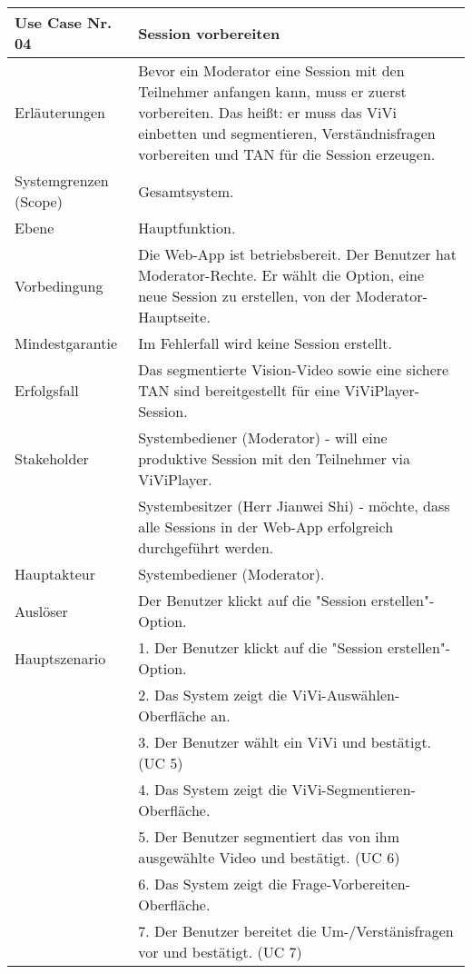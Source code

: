 \begin{tabularx}{\linewidth}{|l|X|}
	\hline
	Use Case Nr. 04			& \textbf{Session vorbereiten} \\ \hline
	Erläuterungen			& Bevor ein Moderator eine Session mit den Teilnehmer anfangen 
	                          kann, muss er zuerst vorbereiten. Das heißt: er muss das ViVi einbetten und segmentieren, Verständnisfragen vorbereiten und TAN für die Session erzeugen. \\ \hline
	Systemgrenzen (Scope)	& Gesamtsystem. \\ \hline
	Ebene					& Hauptfunktion. \\ \hline
	Vorbedingung			& Die Web-App ist betriebsbereit. Der Benutzer hat 
	                          Moderator-Rechte. Er wählt die Option, eine neue Session zu erstellen, von der Moderator-Hauptseite. \\ \hline
	Mindestgarantie			& Im Fehlerfall wird keine Session erstellt.\\ \hline
	Erfolgsfall  			& Das segmentierte Vision-Video sowie eine sichere TAN sind 
	                          bereitgestellt für eine ViViPlayer-Session. \\ \hline
	Stakeholder				& Systembediener (Moderator) - will eine produktive Session mit den 
	                          Teilnehmer via ViViPlayer. \\
							& Systembesitzer (Herr Jianwei Shi) - möchte, dass alle Sessions 
							  in der Web-App erfolgreich durchgeführt werden. \\ \hline
	Hauptakteur				& Systembediener (Moderator). \\ \hline
	Auslöser				& Der Benutzer klickt auf die "Session erstellen"-Option. \\ \hline	
	Hauptszenario			& 1. Der Benutzer klickt auf die "Session erstellen"-Option. \\ 
							& 2. Das System zeigt die ViVi-Auswählen-Oberfläche an. \\
							& 3. Der Benutzer wählt ein ViVi und bestätigt. (UC 5) \\ 
							& 4. Das System zeigt die ViVi-Segmentieren-Oberfläche. \\ 
							& 5. Der Benutzer segmentiert das von ihm ausgewählte Video und 
							  bestätigt. (UC 6) \\
							& 6. Das System zeigt die Frage-Vorbereiten-Oberfläche. \\
							& 7. Der Benutzer bereitet die Um-/Verstänisfragen vor und bestätigt.
							  (UC 7) \\

\end{tabularx}
